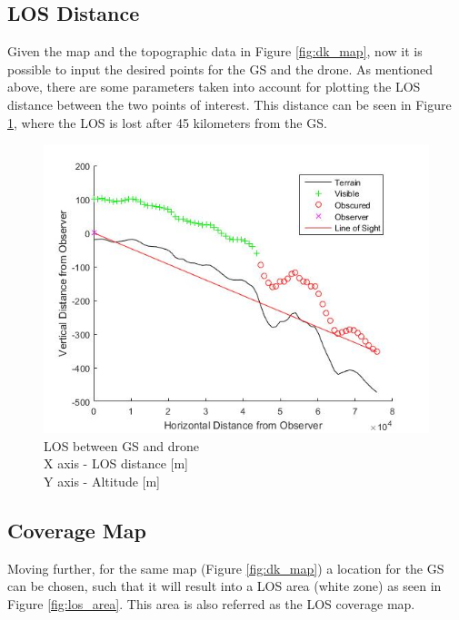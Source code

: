 \subsection{LOS Distance}
Given the map and the topographic data in Figure \ref{fig:dk_map}, now it is possible to input the desired points for the GS and the drone. As mentioned above, there are some parameters taken into account for plotting the LOS distance between the two points of interest. This distance can be seen in Figure \ref{fig:los_2p}, where the LOS is lost after 45 kilometers from the GS.

\begin{figure}[h]
	\centering
	\includegraphics[scale=0.75]{figures/los_2p.jpg}
	\caption{LOS between GS and drone \\ X axis - LOS distance [m] \\ Y axis - Altitude [m]}
   	\label{fig:los_2p}
\end{figure}

\subsection{Coverage Map}
Moving further, for the same map (Figure \ref{fig:dk_map}) a location for the GS can be chosen, such that it will result into a LOS area (white zone) as seen in Figure \ref{fig:los_area}. This area is also referred as the LOS coverage map.

